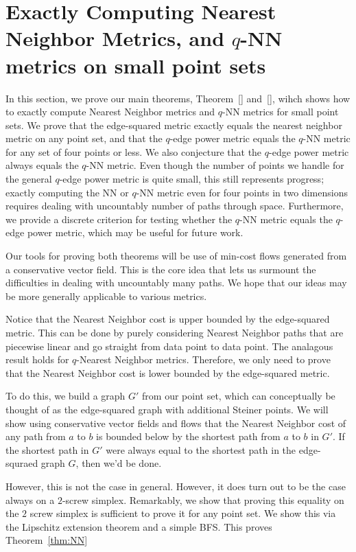 \section{Exactly Computing Nearest Neighbor Metrics, and $q$-NN metrics on
small point sets}\label{sec:metric-equality}

In this section, we prove our main theorems, Theorem~\ref{} and~\ref{},
wihch shows how to exactly compute Nearest Neighbor metrics and $q$-NN
metrics for small point sets.
We prove that the edge-squared metric exactly equals the nearest neighbor
metric on any point set, and that the $q$-edge power metric equals the $q$-NN
metric for any set of four points or less. We also conjecture that the $q$-edge
power metric always equals the $q$-NN metric. Even though the number of points
we handle for the general $q$-edge power metric is quite small, this still
represents progress; exactly computing the NN or $q$-NN metric even for four
points in two dimensions requires dealing with uncountably number of paths
through space. Furthermore, we provide a discrete criterion for testing whether
the $q$-NN metric equals the $q$-edge power metric, which may be useful for
future work.

Our tools for proving both theorems will be use of min-cost flows generated
from a conservative vector field. This is the core idea that lets us surmount
the difficulties in dealing with uncountably many paths. We hope that our ideas
may be more generally applicable to various metrics.  

Notice that the Nearest Neighbor cost is upper bounded by the edge-squared
metric. This can be done by purely considering Nearest Neighbor paths that
are piecewise linear and go straight from data point to data point. The
analagous result holds for $q$-Nearest Neighbor metrics. Therefore, we only
need to prove that the Nearest Neighbor cost is lower bounded by the
edge-squared metric.

To do this, we build a graph $G'$ from our point set, which can
conceptually be thought of as the edge-squared graph with additional
Steiner points. We will show using conservative vector fields and flows
that the Nearest Neighbor cost of any path from $a$ to $b$ is bounded below
by the shortest path from $a$ to $b$ in $G'$. If the shortest path in $G'$
were always equal to the shortest path in the edge-squraed graph $G$, then
we'd be done.

However, this is not the case in general. However, it does turn out to be
the case always on a $2$-screw simplex. Remarkably, we show that proving
this equality on the $2$ screw simplex is sufficient to prove it for any
point set. We show this via the Lipschitz extension theorem and a simple
BFS. This proves Theorem~\ref{thm:NN}


